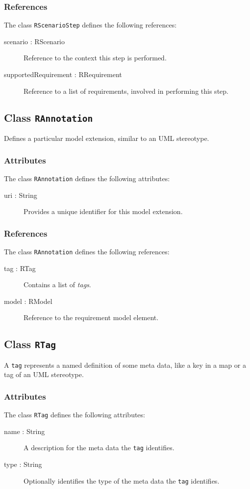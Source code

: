 \subsubsection{References}
The class \verb|RScenarioStep| defines the following references:
\begin{description}
	\item[scenario : RScenario] Reference to the context this step is performed.
	\item[supportedRequirement : RRequirement] Reference to a list of requirements, involved in performing this step.
\end{description}

\subsection{Class {\tt RAnnotation}}
Defines a particular model extension, similar to an UML stereotype.

\subsubsection{Attributes}
The class \verb|RAnnotation| defines the following attributes:
\begin{description}
	\item[uri : String] Provides a unique identifier for this model extension.
\end{description}

\subsubsection{References}
The class \verb|RAnnotation| defines the following references:
\begin{description}
	\item[tag : RTag] Contains a list of \emph{tags}.
	\item[model : RModel] Reference to the requirement model element.
\end{description}

\subsection{Class {\tt RTag}}
A \verb|tag| represents a named definition of some meta data, like a key in a map or a tag of an UML stereotype.

\subsubsection{Attributes}
The class \verb|RTag| defines the following attributes:
\begin{description}
	\item[name : String] A description for the meta data the \verb|tag| identifies.
	\item[type : String] Optionally identifies the type of the meta data the \verb|tag| identifies.
\end{description}

